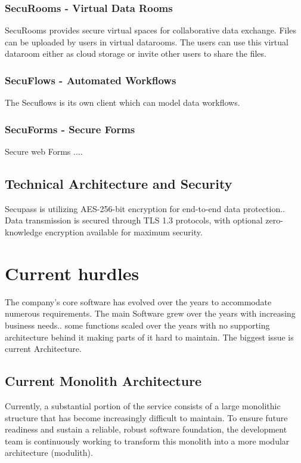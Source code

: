 \subsubsection{SecuRooms - Virtual Data Rooms}\label{sec:securooms}
SecuRooms provides secure virtual spaces for collaborative data exchange. Files can be uploaded by users in virtual datarooms. The users can use this virtual dataroom either as cloud storage or invite other users to share the files. 

\subsubsection{SecuFlows - Automated Workflows}
The Secuflows is its own client which can model data workflows.

\subsubsection{SecuForms - Secure Forms}
Secure web Forms ....

\subsection{Technical Architecture and Security}
Secupass is utilizing AES-256-bit encryption for end-to-end data protection.. Data transmission is secured through TLS 1.3 protocols, with optional zero-knowledge encryption available for maximum security. \cite{ftapi2025}

\section {Current hurdles}
The company's core software has evolved over the years to accommodate numerous requirements. The main Software grew over the years with increasing business needs.. some functions scaled over the years with no supporting architecture behind it making parts of it hard to maintain. The biggest issue is current Architecture.

\subsection{Current Monolith Architecture}
Currently, a substantial portion of the service consists of a large monolithic structure that has become increasingly difficult to maintain. To ensure future readiness and sustain a reliable, robust software foundation, the development team is continuously working to transform this monolith into a more modular architecture (modulith).

